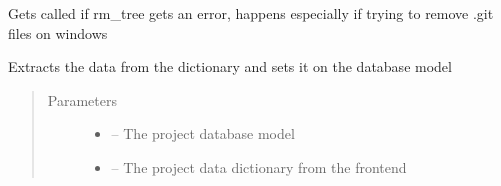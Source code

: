 \documentclass[letterpaper,10pt,english]{sphinxmanual}
\begin{document}

\begin{fulllineitems}
\label{_source/son_editor.impl:son_editor.impl.projectsimpl.on_rm_error}
Gets called if rm\_tree gets an error, happens
especially if trying to remove .git files on windows

\end{fulllineitems}


\begin{fulllineitems}
\label{_source/son_editor.impl:son_editor.impl.projectsimpl.set_data}
Extracts the data from the dictionary and sets it on the database model
\begin{quote}\begin{description}
\item[{Parameters}] \leavevmode\begin{itemize}
\item {} 
 -- The project database model

\item {} 
 -- The project data dictionary from the frontend

\end{itemize}

\end{description}\end{quote}

\end{fulllineitems}

\end{document}
